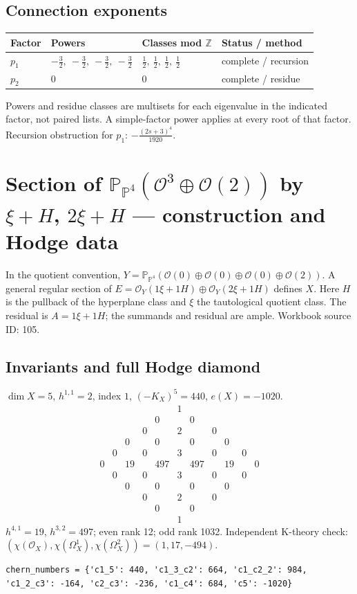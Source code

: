 \documentclass[10pt,a4paper]{article}
\begin{document}
\subsection*{Connection exponents}
\begin{center}\begin{tabular}{llll}\toprule Factor & Powers & Classes mod $\mathbb Z$ & Status / method\\\midrule
$p_{1}$ & $- \frac{3}{2},\ - \frac{3}{2},\ - \frac{3}{2},\ - \frac{3}{2}$ & $\frac{1}{2},\ \frac{1}{2},\ \frac{1}{2},\ \frac{1}{2}$ & complete / recursion\\
$p_{2}$ & $0$ & $0$ & complete / residue\\
\bottomrule\end{tabular}\end{center}
Powers and residue classes are multisets for each eigenvalue in the indicated factor, not paired lists. A simple-factor power applies at every root of that factor.
Recursion obstruction for $p_{1}$: $- \frac{\left(2 s + 3\right)^{4}}{1920}$.
\clearpage\section*{Section of $\mathbb P_{\mathbb P^{4}}(\mathcal O^{3}\oplus \mathcal O(2))$ by $\xi +H$, $2\xi +H$ --- construction and Hodge data}\label{entry:PB5-105}
In the quotient convention, $Y=\mathbb P_{\mathbb P^{4}}(\mathcal O(0)\oplus\mathcal O(0)\oplus\mathcal O(0)\oplus\mathcal O(2))$.
A general regular section of $E=\mathcal O_Y(1\xi+1H)\oplus\mathcal O_Y(2\xi+1H)$ defines $X$.
Here $H$ is the pullback of the hyperplane class and $\xi$ the tautological quotient class. The residual is $A=1\xi+1H$; the summands and residual are ample.
Workbook source ID: 105.
\subsection*{Invariants and full Hodge diamond}
$\dim X=5$, $h^{1,1}=2$, index $1$, $(-K_X)^5=440$, $e(X)=-1020$.
\[\begin{array}{ccccccccccc}&&&&&1&&&&&\\&&&&0&&0&&&&\\&&&0&&2&&0&&&\\&&0&&0&&0&&0&&\\&0&&0&&3&&0&&0&\\0&&19&&497&&497&&19&&0\\&0&&0&&3&&0&&0&\\&&0&&0&&0&&0&&\\&&&0&&2&&0&&&\\&&&&0&&0&&&&\\&&&&&1&&&&&\end{array}\]
$h^{4,1}=19$, $h^{3,2}=497$; even rank 12; odd rank 1032.
Independent K-theory check: $(\chi(\mathcal O_X),\chi(\Omega_X^1),\chi(\Omega_X^2))=(1, 17, -494)$.
\begin{lstlisting}
chern_numbers = {'c1_5': 440, 'c1_3_c2': 664, 'c1_c2_2': 984, 'c1_2_c3': -164, 'c2_c3': -236, 'c1_c4': 684, 'c5': -1020}
\end{lstlisting}
\end{document}
